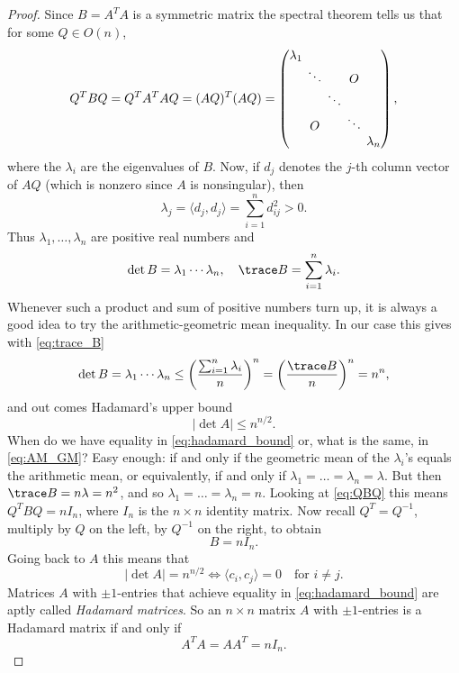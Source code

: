 \begin{proof}
  Since $B = A^T A$ is a symmetric matrix the spectral theorem tells us that for some $Q \in O(n)$,
  \begin{equation} \label{eq:QBQ}
  \setlength{\arraycolsep}{2pt}
  Q^T B Q = Q^T A^T A Q = (AQ)^T (AQ) =
  \begin{pmatrix}
  \lambda_1 & & & & \\
  & \ddots & & O & \\
  & & \ddots & & \\
  & O & & \ddots & \\
  & & & & \lambda_n
  \end{pmatrix},
  \end{equation}
  where the $\lambda_i$ are the eigenvalues of $B$. Now, if $d_j$ denotes the $j$-th column vector of $AQ$ (which is nonzero since $A$ is nonsingular), then
  \[
  \lambda_j = \langle d_j, d_j \rangle = \sum_{i=1}^n d_{ij}^2 > 0.
  \]
  Thus $\lambda_1, \dots, \lambda_n$ are positive real numbers and
  \[
  \det B = \lambda_1 \cdots \lambda_n, \quad \trace B = \sum_{i=1}^n \lambda_i.
  \]
  Whenever such a product and sum of positive numbers turn up, it is always a good idea to try the arithmetic-geometric mean inequality. In our case this gives with \eqref{eq:trace_B}
  \begin{equation} \label{eq:AM_GM}
  \det B = \lambda_1 \cdots \lambda_n \le \left( \frac{\sum_{i=1}^n \lambda_i}{n} \right)^n = \left( \frac{\trace B}{n} \right)^n = n^n,
  \end{equation}
  and out comes Hadamard's upper bound
  \begin{equation} \label{eq:hadamard_bound}
  |\det A| \le n^{n/2}.
  \end{equation}
  When do we have equality in \eqref{eq:hadamard_bound} or, what is the same, in \eqref{eq:AM_GM}? Easy enough: if and only if the geometric mean of the $\lambda_i$'s equals the arithmetic mean, or equivalently, if and only if $\lambda_1 = \dots = \lambda_n = \lambda$. But then $\trace B = n\lambda = n^2$, and so $\lambda_1 = \dots = \lambda_n = n$. Looking at \eqref{eq:QBQ} this means $Q^T B Q = n I_n$, where $I_n$ is the $n \times n$ identity matrix. Now recall $Q^T = Q^{-1}$, multiply by $Q$ on the left, by $Q^{-1}$ on the right, to obtain
  \[
  B = n I_n.
  \]
  Going back to $A$ this means that
  \[
  |\det A| = n^{n/2} \iff \langle c_i, c_j \rangle = 0 \quad \text{for } i \ne j.
  \]
  Matrices $A$ with $\pm 1$-entries that achieve equality in \eqref{eq:hadamard_bound} are aptly called \emph{Hadamard matrices}. So an $n \times n$ matrix $A$ with $\pm 1$-entries is a Hadamard matrix if and only if
  \[
  A^T A = A A^T = n I_n.
  \]
\end{proof}


